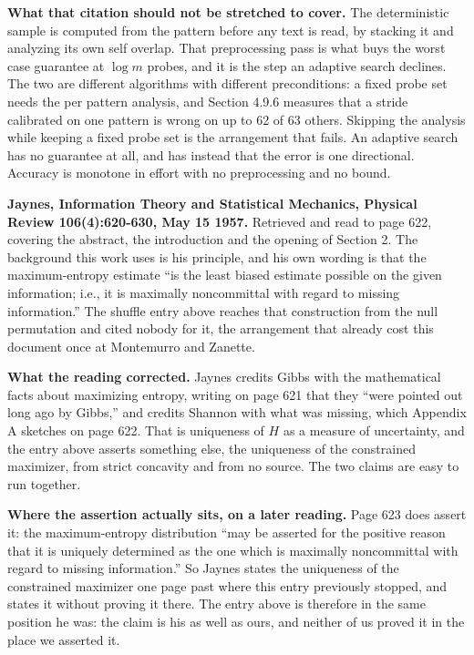 \textbf{What that citation should not be stretched to cover.} The deterministic sample is computed from the pattern before any text is read, by stacking it and analyzing its own self overlap. That preprocessing pass is what buys the worst case guarantee at \(\log m\) probes, and it is the step an adaptive search declines. The two are different algorithms with different preconditions: a fixed probe set needs the per pattern analysis, and Section 4.9.6 measures that a stride calibrated on one pattern is wrong on up to 62 of 63 others. Skipping the analysis while keeping a fixed probe set is the arrangement that fails. An adaptive search has no guarantee at all, and has instead that the error is one directional. Accuracy is monotone in effort with no preprocessing and no bound.

\textbf{Jaynes, Information Theory and Statistical Mechanics, Physical Review 106(4):620-630, May 15 1957.} Retrieved and read to page 622, covering the abstract, the introduction and the opening of Section 2. The background this work uses is his principle, and his own wording is that the maximum-entropy estimate ``is the least biased estimate possible on the given information; i.e., it is maximally noncommittal with regard to missing information.'' The shuffle entry above reaches that construction from the null permutation and cited nobody for it, the arrangement that already cost this document once at Montemurro and Zanette.

\textbf{What the reading corrected.} Jaynes credits Gibbs with the mathematical facts about maximizing entropy, writing on page 621 that they ``were pointed out long ago by Gibbs,'' and credits Shannon with what was missing, which Appendix A sketches on page 622. That is uniqueness of \(H\) as a measure of uncertainty, and the entry above asserts something else, the uniqueness of the constrained maximizer, from strict concavity and from no source. The two claims are easy to run together.

\textbf{Where the assertion actually sits, on a later reading.} Page 623 does assert it: the maximum-entropy distribution ``may be asserted for the positive reason that it is uniquely determined as the one which is maximally noncommittal with regard to missing information.'' So Jaynes states the uniqueness of the constrained maximizer one page past where this entry previously stopped, and states it without proving it there. The entry above is therefore in the same position he was: the claim is his as well as ours, and neither of us proved it in the place we asserted it.

